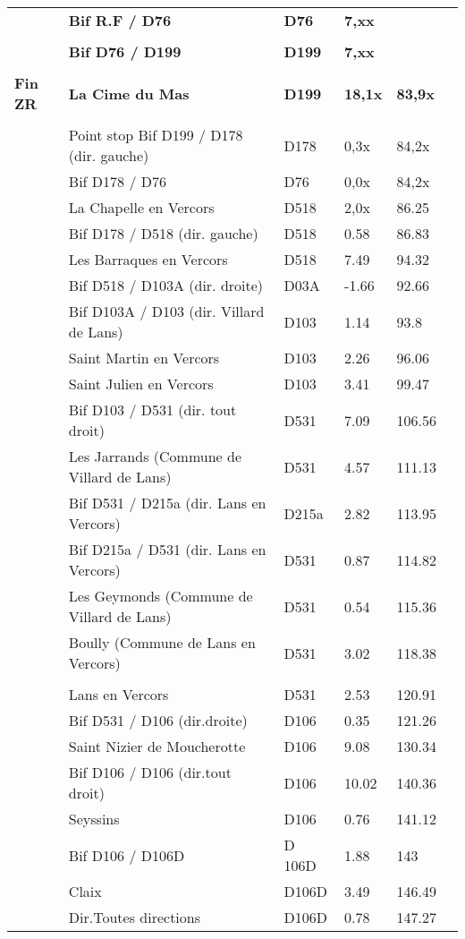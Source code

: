 \documentclass{article}%
\begin{document}
\begin{longtable}{p{2.25cm}|p{7.0cm}|p{1.5cm}|p{1.5cm}|p{1.5cm}|p{3.5cm}}
 &\textbf{Bif R.F / D76}&\textbf{D76}&\textbf{7,xx}& & \\%
 & & & & & \\%
 &\textbf{Bif D76 / D199}&\textbf{D199}&\textbf{7,xx}& & \\%
 & & & & & \\%
\textbf{Fin ZR }&\textbf{La Cime du Mas}&\textbf{D199}&\textbf{18,1x}&\textbf{83,9x}& \\%
 & & & & & \\%
 &Point stop Bif D199 / D178 (dir. gauche)&D178&0,3x&84,2x& \\%
 &Bif D178 / D76 &D76&0,0x&84,2x& \\%
 &La Chapelle en Vercors&D518&2,0x&86.25& \\%
 &Bif D178 / D518 (dir. gauche)&D518&0.58&86.83& \\%
 &Les Barraques en Vercors&D518&7.49&94.32& \\%
 &Bif D518 / D103A (dir. droite)&D03A&-1.66&92.66& \\%
 &Bif D103A / D103  (dir. Villard de Lans)&D103 &1.14&93.8& \\%
 &Saint Martin en Vercors&D103&2.26&96.06& \\%
 &Saint Julien en Vercors&D103&3.41&99.47& \\%
 &Bif D103 / D531 (dir. tout droit)&D531&7.09&106.56& \\%
 &Les Jarrands (Commune de Villard de Lans)&D531&4.57&111.13& \\%
 &Bif D531 / D215a (dir. Lans en Vercors)&D215a&2.82&113.95& \\%
 &Bif D215a / D531 (dir. Lans en Vercors)&D531&0.87&114.82& \\%
 &Les Geymonds (Commune de Villard de Lans)&D531&0.54&115.36& \\%
 &Boully (Commune de Lans en Vercors)&D531&3.02&118.38& \\%
\hline& & & & & \\%
 &Lans en Vercors&D531&2.53&120.91& \\%
 &Bif D531 / D106 (dir.droite)&D106&0.35&121.26& \\%
 &Saint Nizier de Moucherotte&D106&9.08&130.34& \\%
 &Bif D106 / D106 (dir.tout droit)&D106&10.02&140.36& \\%
 &Seyssins&D106&0.76&141.12& \\%
 &Bif D106 / D106D&D 106D&1.88&143& \\%
 &Claix&D106D&3.49&146.49& \\%
 &Dir.Toutes directions&D106D&0.78&147.27& \\%

\end{longtable}
\end{document}
